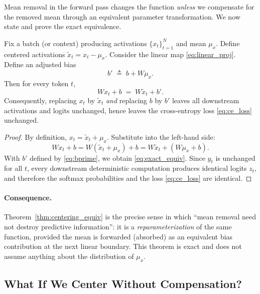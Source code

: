 Mean removal in the forward pass changes the function \emph{unless} we compensate for the removed mean through an equivalent parameter transformation.
We now state and prove the exact equivalence.

\begin{theorem}
\label{thm:centering_equiv}
Fix a batch (or context) producing activations $\{x_t\}_{t=1}^N$ and mean $\mu_x$.
Define centered activations $\tilde{x}_t = x_t - \mu_x$.
Consider the linear map \eqref{eq:linear_proj}.
Define an adjusted bias
\begin{equation}
\label{eq:bprime}
b' \;\triangleq\; b + W\mu_x.
\end{equation}
Then for every token $t$,
\begin{equation}
\label{eq:exact_equiv}
W x_t + b \;=\; W\tilde{x}_t + b'.
\end{equation}
Consequently, replacing $x_t$ by $\tilde{x}_t$ \emph{and} replacing $b$ by $b'$ leaves all downstream activations and logits unchanged, hence leaves the cross-entropy loss \eqref{eq:ce_loss} unchanged.
\end{theorem}

\begin{proof}
By definition, $x_t=\tilde{x}_t+\mu_x$. Substitute into the left-hand side:
\[
W x_t + b = W(\tilde{x}_t+\mu_x)+b = W\tilde{x}_t + (W\mu_x+b).
\]
With $b'$ defined by \eqref{eq:bprime}, we obtain \eqref{eq:exact_equiv}.
Since $y_t$ is unchanged for all $t$, every downstream deterministic computation produces identical logits $z_t$, and therefore the softmax probabilities and the loss \eqref{eq:ce_loss} are identical.
\end{proof}

\paragraph{Consequence.}
Theorem~\ref{thm:centering_equiv} is the precise sense in which ``mean removal need not destroy predictive information'':
it is a \emph{reparameterization} of the same function, provided the mean is forwarded (absorbed) as an equivalent bias contribution at the next linear boundary.
This theorem is exact and does not assume anything about the distribution of $\mu_x$.

\subsection{What If We Center Without Compensation?}

